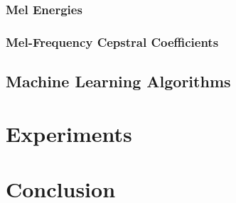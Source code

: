 \documentclass[
onecolumn,
]{ceurart}
\begin{document}
\subsubsection{Mel Energies}

\subsubsection{Mel-Frequency Cepstral Coefficients}

\subsection{Machine Learning Algorithms}

\section{Experiments}




\section{Conclusion}



\end{document}
